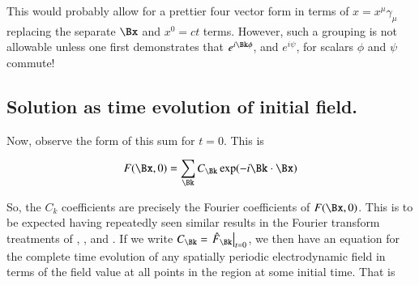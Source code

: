 \documentclass{article}
\begin{document}
This would probably allow for a prettier four vector form in terms of $x = x^\mu \gamma_\mu$ replacing the separate $\Bx$ and $x^0 = ct$ terms.
However, 
such a grouping is not allowable unless one first demonstrates that $e^{i \Bk \phi }$, and $e^{i \psi }$, for scalars $\phi$ and $\psi$ commute!

%
%
%
%
%
%
%

\subsection{ Solution as time evolution of initial field. }

Now, observe the form of this sum for $t=0$.  This is

\begin{align*}
F(\Bx,0) 
&= \sum_{\Bk} C_{\Bk} \exp(-i \Bk \cdot \Bx ) \\
\end{align*}

So, the $C_k$ coefficients are precisely the Fourier coefficients of $F(\Bx,0)$.  This is to be expected having repeatedly seen similar results in the Fourier transform treatments of 
\cite{PJfourierMaxwellSecondOrder}, \cite{PJfirstOrderMaxwell}, and \cite{PJ4dFourier}.
If we write 
$
C_{\Bk}
=
{\left.\hat{F}_{\Bk}\right\vert}_{t=0}
$, we then have an equation for the complete time evolution of any spatially periodic electrodynamic field in terms of the field value at all points in the region at some initial time.  That is
\end{document}
